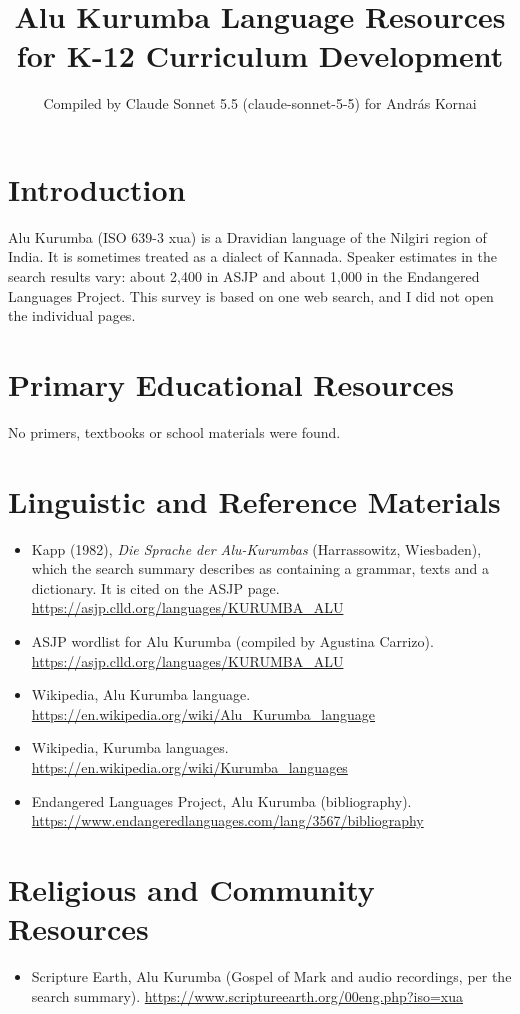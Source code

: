 \documentclass[12pt]{article}
\title{Alu Kurumba Language Resources for K-12 Curriculum Development}
\author{Compiled by Claude Sonnet 5.5 (claude-sonnet-5-5) for Andr\'as Kornai}
\date{}
\begin{document}
\maketitle

\section{Introduction}
Alu Kurumba (ISO 639-3 xua) is a Dravidian language of the Nilgiri region of India. It is sometimes treated as a dialect of Kannada. Speaker estimates in the search results vary: about 2,400 in ASJP and about 1,000 in the Endangered Languages Project. This survey is based on one web search, and I did not open the individual pages.

\section{Primary Educational Resources}
No primers, textbooks or school materials were found.

\section{Linguistic and Reference Materials}
\begin{itemize}
\item Kapp (1982), \emph{Die Sprache der Alu-Kurumbas} (Harrassowitz, Wiesbaden), which the search summary describes as containing a grammar, texts and a dictionary. It is cited on the ASJP page. \url{https://asjp.clld.org/languages/KURUMBA_ALU}
\item ASJP wordlist for Alu Kurumba (compiled by Agustina Carrizo). \url{https://asjp.clld.org/languages/KURUMBA_ALU}
\item Wikipedia, Alu Kurumba language. \url{https://en.wikipedia.org/wiki/Alu_Kurumba_language}
\item Wikipedia, Kurumba languages. \url{https://en.wikipedia.org/wiki/Kurumba_languages}
\item Endangered Languages Project, Alu Kurumba (bibliography). \url{https://www.endangeredlanguages.com/lang/3567/bibliography}
\end{itemize}

\section{Religious and Community Resources}
\begin{itemize}
\item Scripture Earth, Alu Kurumba (Gospel of Mark and audio recordings, per the search summary). \url{https://www.scriptureearth.org/00eng.php?iso=xua}
\end{itemize}
\end{document}
